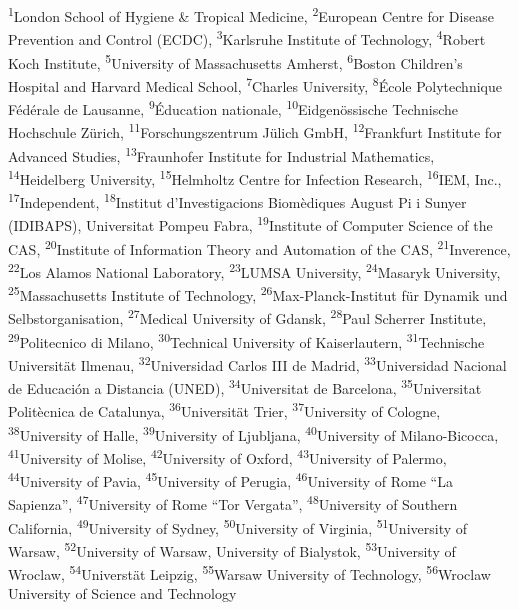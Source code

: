\documentclass[
]{article}
\begin{document}
\textsuperscript{1}London School of Hygiene \& Tropical Medicine, \textsuperscript{2}European Centre for Disease Prevention and Control (ECDC), \textsuperscript{3}Karlsruhe Institute of Technology, \textsuperscript{4}Robert Koch Institute, \textsuperscript{5}University of Massachusetts Amherst, \textsuperscript{6}Boston Children's Hospital and Harvard Medical School, \textsuperscript{7}Charles University, \textsuperscript{8}École Polytechnique Fédérale de Lausanne, \textsuperscript{9}Éducation nationale, \textsuperscript{10}Eidgenössische Technische Hochschule Zürich, \textsuperscript{11}Forschungszentrum Jülich GmbH, \textsuperscript{12}Frankfurt Institute for Advanced Studies, \textsuperscript{13}Fraunhofer Institute for Industrial Mathematics, \textsuperscript{14}Heidelberg University, \textsuperscript{15}Helmholtz Centre for Infection Research, \textsuperscript{16}IEM, Inc., \textsuperscript{17}Independent, \textsuperscript{18}Institut d'Investigacions Biomèdiques August Pi i Sunyer (IDIBAPS), Universitat Pompeu Fabra, \textsuperscript{19}Institute of Computer Science of the CAS, \textsuperscript{20}Institute of Information Theory and Automation of the CAS, \textsuperscript{21}Inverence, \textsuperscript{22}Los Alamos National Laboratory, \textsuperscript{23}LUMSA University, \textsuperscript{24}Masaryk University, \textsuperscript{25}Massachusetts Institute of Technology, \textsuperscript{26}Max-Planck-Institut für Dynamik und Selbstorganisation, \textsuperscript{27}Medical University of Gdansk, \textsuperscript{28}Paul Scherrer Institute, \textsuperscript{29}Politecnico di Milano, \textsuperscript{30}Technical University of Kaiserlautern, \textsuperscript{31}Technische Universität Ilmenau, \textsuperscript{32}Universidad Carlos III de Madrid, \textsuperscript{33}Universidad Nacional de Educación a Distancia (UNED), \textsuperscript{34}Universitat de Barcelona, \textsuperscript{35}Universitat Politècnica de Catalunya, \textsuperscript{36}Universität Trier, \textsuperscript{37}University of Cologne, \textsuperscript{38}University of Halle, \textsuperscript{39}University of Ljubljana, \textsuperscript{40}University of Milano-Bicocca, \textsuperscript{41}University of Molise, \textsuperscript{42}University of Oxford, \textsuperscript{43}University of Palermo, \textsuperscript{44}University of Pavia, \textsuperscript{45}University of Perugia, \textsuperscript{46}University of Rome ``La Sapienza'', \textsuperscript{47}University of Rome ``Tor Vergata'', \textsuperscript{48}University of Southern California, \textsuperscript{49}University of Sydney, \textsuperscript{50}University of Virginia, \textsuperscript{51}University of Warsaw, \textsuperscript{52}University of Warsaw, University of Bialystok, \textsuperscript{53}University of Wroclaw, \textsuperscript{54}Universtät Leipzig, \textsuperscript{55}Warsaw University of Technology, \textsuperscript{56}Wroclaw University of Science and Technology
\end{document}
